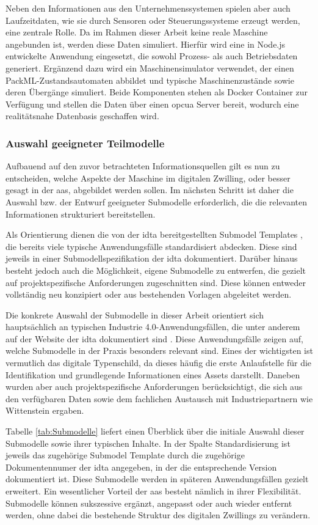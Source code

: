 Neben den Informationen aus den Unternehmenssystemen spielen aber auch Laufzeitdaten, wie sie durch Sensoren oder Steuerungssysteme erzeugt werden, eine zentrale Rolle.
Da im Rahmen dieser Arbeit keine reale Maschine angebunden ist, werden diese Daten simuliert.
Hierfür wird eine in Node.js entwickelte Anwendung eingesetzt, die sowohl Prozess- als auch Betriebsdaten generiert. 
Ergänzend dazu wird ein Maschinensimulator verwendet, der einen PackML-Zustandsautomaten abbildet und typische Maschinenzustände sowie deren Übergänge simuliert. 
Beide Komponenten stehen als Docker Container zur Verfügung und stellen die Daten über einen \acs{opcua} Server bereit, wodurch eine realitätsnahe Datenbasis geschaffen wird.
\subsubsection{Auswahl geeigneter Teilmodelle}
Aufbauend auf den zuvor betrachteten Informationsquellen gilt es nun zu entscheiden, welche Aspekte der Maschine im digitalen Zwilling, oder besser gesagt in der \acs{aas}, abgebildet werden sollen.
Im nächsten Schritt ist daher die Auswahl bzw. der Entwurf geeigneter Submodelle erforderlich, die die relevanten Informationen strukturiert bereitstellen.

Als Orientierung dienen die von der \acs{idta} bereitgestellten Submodel Templates \cite{idtaTemplates}, die bereits viele typische Anwendungsfälle standardisiert abdecken.
Diese sind jeweils in einer Submodellspezifikation der \acs{idta} dokumentiert.
Darüber hinaus besteht jedoch auch die Möglichkeit, eigene Submodelle zu entwerfen, die gezielt auf projektspezifische Anforderungen zugeschnitten sind.
Diese können entweder vollständig neu konzipiert oder aus bestehenden Vorlagen abgeleitet werden.

Die konkrete Auswahl der Submodelle in dieser Arbeit orientiert sich hauptsächlich an typischen Industrie 4.0-Anwendungsfällen, die unter anderem auf der Website der \acs{idta} dokumentiert sind \cite{idtaUseCases}.
Diese Anwendungsfälle zeigen auf, welche Submodelle in der Praxis besonders relevant sind.
Eines der wichtigsten ist vermutlich das digitale Typenschild, da dieses häufig die erste Anlaufstelle für die Identifikation und grundlegende Informationen eines Assets darstellt.
Daneben wurden aber auch projektspezifische Anforderungen berücksichtigt, die sich aus den verfügbaren Daten sowie dem fachlichen Austausch mit Industriepartnern wie Wittenstein ergaben.

Tabelle \ref{tab:Submodelle} liefert einen Überblick über die initiale Auswahl dieser Submodelle sowie ihrer typischen Inhalte.
In der Spalte Standardisierung ist jeweils das zugehörige Submodel Template durch die zugehörige Dokumentennumer der \acs{idta} angegeben, in der die entsprechende Version dokumentiert ist.
Diese Submodelle werden in späteren Anwendungsfällen gezielt erweitert.
Ein wesentlicher Vorteil der \acs{aas} besteht nämlich in ihrer Flexibilität.
Submodelle können sukszessive ergänzt, angepasst oder auch wieder entfernt werden, ohne dabei die bestehende Struktur des digitalen Zwillings zu verändern.


